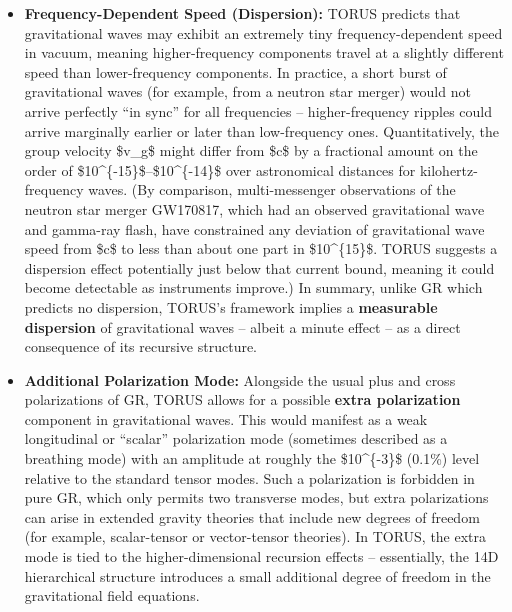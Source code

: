 \documentclass[
]{article}
\begin{document}
\begin{itemize}
\item
  \textbf{Frequency-Dependent Speed (Dispersion):} TORUS predicts that
  gravitational waves may exhibit an extremely tiny frequency-dependent
  speed in vacuum, meaning higher-frequency components travel at a
  slightly different speed than lower-frequency components\hspace{0pt}.
  In practice, a short burst of gravitational waves (for example, from a
  neutron star merger) would not arrive perfectly ``in sync'' for all
  frequencies -- higher-frequency ripples could arrive marginally
  earlier or later than low-frequency ones. Quantitatively, the group
  velocity \$v\_g\$ might differ from \$c\$ by a fractional amount on
  the order of \$10\^{}\{-15\}\$--\$10\^{}\{-14\}\$ over astronomical
  distances for kilohertz-frequency waves\hspace{0pt}. (By comparison,
  multi-messenger observations of the neutron star merger GW170817,
  which had an observed gravitational wave and gamma-ray flash, have
  constrained any deviation of gravitational wave speed from \$c\$ to
  less than about one part in \$10\^{}\{15\}\$\hspace{0pt}. TORUS
  suggests a dispersion effect potentially just below that current
  bound, meaning it could become detectable as instruments improve.) In
  summary, unlike GR which predicts no dispersion, TORUS's framework
  implies a \textbf{measurable dispersion} of gravitational waves --
  albeit a minute effect -- as a direct consequence of its recursive
  structure.
\item
  \textbf{Additional Polarization Mode:} Alongside the usual plus and
  cross polarizations of GR, TORUS allows for a possible \textbf{extra
  polarization} component in gravitational waves\hspace{0pt}. This would
  manifest as a weak longitudinal or ``scalar'' polarization mode
  (sometimes described as a breathing mode) with an amplitude at roughly
  the \$10\^{}\{-3\}\$ (0.1\%) level relative to the standard tensor
  modes\hspace{0pt}. Such a polarization is forbidden in pure GR, which
  only permits two transverse modes, but extra polarizations can arise
  in extended gravity theories that include new degrees of freedom (for
  example, scalar-tensor or vector-tensor theories). In TORUS, the extra
  mode is tied to the higher-dimensional recursion effects --
  essentially, the 14D hierarchical structure introduces a small
  additional degree of freedom in the gravitational field equations.

\end{itemize}
\end{document}
